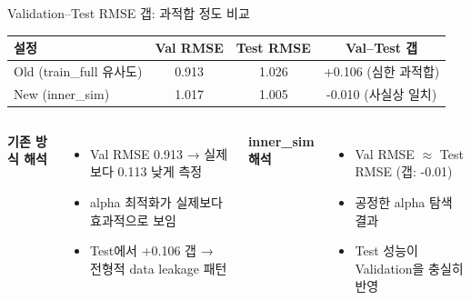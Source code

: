 \documentclass[aspectratio=169,10pt]{beamer}
\begin{document}
\begin{frame}{Validation–Test RMSE 갭: 과적합 정도 비교}
	\begin{center}
	\renewcommand{\arraystretch}{1.35}
	\begin{tabular}{l|c|c|c}
		\toprule
		\textbf{설정} & \textbf{Val RMSE} & \textbf{Test RMSE} & \textbf{Val–Test 갭} \\
		\midrule
		Old (train\_full 유사도) & 0.913 & 1.026 & \textcolor{negred}{+0.106 (심한 과적합)} \\
		\rowcolor{testgreen!20}
		New (inner\_sim) & 1.017 & 1.005 & \textcolor{testgreen}{-0.010 (사실상 일치)} \\
		\bottomrule
	\end{tabular}
	\end{center}

	\vspace{0.4em}
	\begin{columns}[T]
			\textbf{기존 방식 해석}
			\begin{itemize}
				\item Val RMSE 0.913 → 실제보다 0.113 낮게 측정
				\item alpha 최적화가 실제보다 효과적으로 보임
				\item Test에서 +0.106 갭 → 전형적 data leakage 패턴
			\end{itemize}

			\textbf{inner\_sim 해석}
			\begin{itemize}
				\item Val RMSE $\approx$ Test RMSE (갭: -0.01)
				\item 공정한 alpha 탐색 결과
				\item Test 성능이 Validation을 충실히 반영
			\end{itemize}
	\end{columns}
\end{frame}
\end{document}

